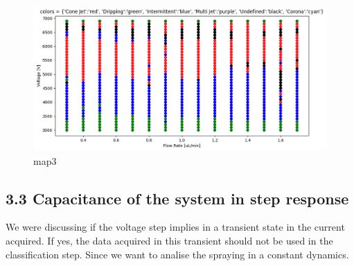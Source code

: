     \begin{figure}[H]
        \center
        \includegraphics[width=15cm]{images/map3.png}
        \caption{map3}
    \end{figure}






\subsection*{3.3 Capacitance of the system in step response}

    We were discussing if the voltage step implies in a transient state in the current acquired.
    If yes, the data acquired in this transient should not be used in the classification step. Since we want to analise
    the spraying in a constant dynamics.

